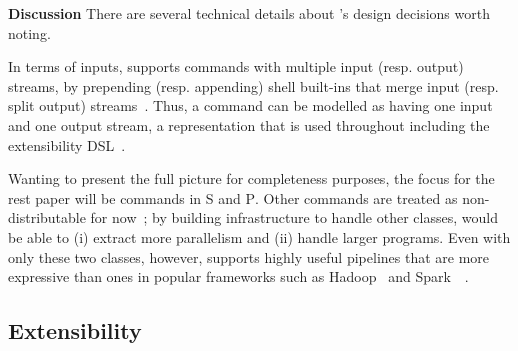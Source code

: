 \documentclass[sigplan,10pt,review,anonymous]{acmart}
\newcommand{\heading}[1]{\vspace{4pt}\noindent\textbf{#1}\enspace}
\newcommand{\ttt}[1]{\texttt{\small #1}}
\newcommand{\cn}[1]{\mbox{\textcircled{\footnotesize #1}}}
\newcommand{\pur}{\cn{\textsc{P}}\xspace}
\newcommand{\sta}{\cn{\textsc{S}}\xspace}
\begin{document}
\heading{Discussion}
There are several technical details about \sys's design decisions worth noting.

In terms of inputs, \sys supports commands with multiple input (resp. output) streams, by prepending (resp. appending) shell built-ins that merge input (resp. split output) streams~.
Thus, a command can be modelled as having one input and one output stream, a representation that is used throughout \sys including the extensibility DSL~.

Wanting to present the full picture for completeness purposes, the focus for the rest paper will be commands in \sta and \pur.
Other commands are treated as  non-distributable for now~;
  by building infrastructure to handle other classes, \sys would be able to (i) extract more parallelism and (ii) handle larger programs.
Even with only these two classes, however, \sys supports highly useful pipelines that are more expressive than ones in popular frameworks such as Hadoop~\cite{mapreduce:08} and Spark~\cite{spark:12}~.

\subsection{Extensibility}
\label{ext}


\end{document}

